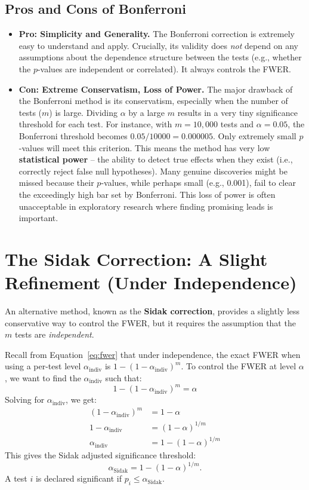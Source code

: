 \documentclass[12pt]{book}
\newcommand{\pvalue}{$p$-value}          %
\begin{document}
\subsection{Pros and Cons of Bonferroni}
\begin{itemize}[wide]
  \item \textbf{Pro: Simplicity and Generality.} The Bonferroni correction is extremely easy to understand and apply. Crucially, its validity does \emph{not} depend on any assumptions about the dependence structure between the tests (e.g., whether the \pvalue s are independent or correlated). It always controls the FWER.
  \item \textbf{Con: Extreme Conservatism, Loss of Power.} The major drawback of the Bonferroni method is its conservatism, especially when the number of tests ($m$) is large. Dividing $\alpha$ by a large $m$ results in a very tiny significance threshold for each test. For instance, with $m=10,000$ tests and $\alpha=0.05$, the Bonferroni threshold becomes $0.05 / 10000 = 0.000005$. Only extremely small \pvalue s will meet this criterion. This means the method has very low \textbf{statistical power} – the ability to detect true effects when they exist (i.e., correctly reject false null hypotheses). Many genuine discoveries might be missed because their \pvalue s, while perhaps small (e.g., 0.001), fail to clear the exceedingly high bar set by Bonferroni. This loss of power is often unacceptable in exploratory research where finding promising leads is important.
\end{itemize}

\section{The Sidak Correction: A Slight Refinement (Under Independence)}
An alternative method, known as the \textbf{Sidak correction}, provides a slightly less conservative way to control the FWER, but it requires the assumption that the $m$ tests are \emph{independent}.

Recall from Equation~\eqref{eq:fwer} that under independence, the exact FWER when using a per-test level $\alpha_{\text{indiv}}$ is $1 - (1-\alpha_{\text{indiv}})^m$. To control the FWER at level $\alpha$, we want to find the $\alpha_{\text{indiv}}$ such that:
\begin{equation}
    1 - (1-\alpha_{\text{indiv}})^m = \alpha
\end{equation}
Solving for $\alpha_{\text{indiv}}$, we get:
\begin{align}
    (1-\alpha_{\text{indiv}})^m &= 1 - \alpha \\
    1-\alpha_{\text{indiv}} &= (1 - \alpha)^{1/m} \\
    \alpha_{\text{indiv}} &= 1 - (1-\alpha)^{1/m}
\end{align}
This gives the Sidak adjusted significance threshold:
\begin{equation}
  \alpha_{\text{Sidak}} = 1 - (1-\alpha)^{1/m}.
\end{equation}
A test $i$ is declared significant if $p_i \le \alpha_{\text{Sidak}}$.
\end{document}
